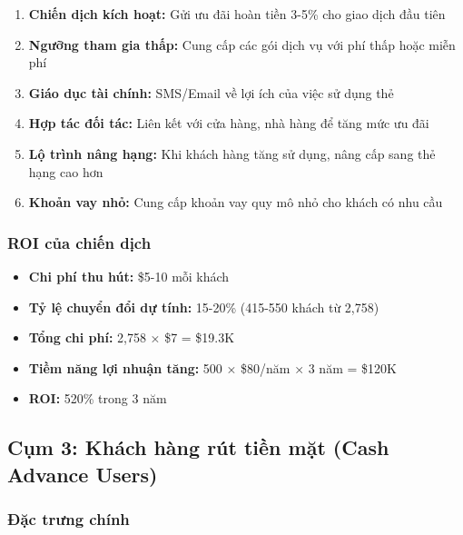 \begin{enumerate}
    \item \textbf{Chiến dịch kích hoạt:} Gửi ưu đãi hoàn tiền 3-5\% cho giao dịch đầu tiên
    \item \textbf{Ngưỡng tham gia thấp:} Cung cấp các gói dịch vụ với phí thấp hoặc miễn phí
    \item \textbf{Giáo dục tài chính:} SMS/Email về lợi ích của việc sử dụng thẻ
    \item \textbf{Hợp tác đối tác:} Liên kết với cửa hàng, nhà hàng để tăng mức ưu đãi
    \item \textbf{Lộ trình nâng hạng:} Khi khách hàng tăng sử dụng, nâng cấp sang thẻ hạng cao hơn
    \item \textbf{Khoản vay nhỏ:} Cung cấp khoản vay quy mô nhỏ cho khách có nhu cầu
\end{enumerate}

\subsubsection{ROI của chiến dịch}

\begin{itemize}
    \item \textbf{Chi phí thu hút:} \$5-10 mỗi khách
    \item \textbf{Tỷ lệ chuyển đổi dự tính:} 15-20\% (415-550 khách từ 2,758)
    \item \textbf{Tổng chi phí:} 2,758 × \$7 = \$19.3K
    \item \textbf{Tiềm năng lợi nhuận tăng:} 500 × \$80/năm × 3 năm = \$120K
    \item \textbf{ROI:} 520\% trong 3 năm
\end{itemize}

\subsection{Cụm 3: Khách hàng rút tiền mặt (Cash Advance Users)}

\subsubsection{Đặc trưng chính}


